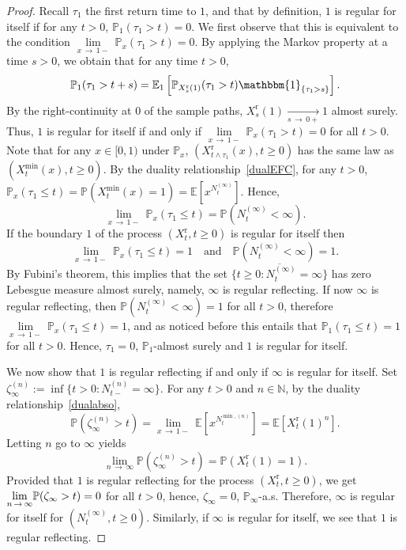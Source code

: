 \documentclass[10pt]{amsart}
\theoremstyle{definition}\newtheorem{defi}[theo]{Definition}\newtheorem{rema}[theo]{Remark}\newtheorem{exam}[theo]{Example}\newtheorem{exem}[theo]{Example}\newtheorem{nota}[theo]{Notation}
\newcommand{\rmr}{\mathrm{r}}
\newcommand{\bbmun}{\mathbbm{1}}
\newcommand{\bbN}{\mathbb{N}}
\newcommand{\bbE}{\mathbb{E}}
\newcommand{\bbP}{\mathbb{P}}
\begin{document}
\begin{proof}
Recall $\tau_1$ the first return time to $1$, and that by definition, $1$ is regular for itself if for any $t>0$, $\bbP_1(\tau_1>t)=0$. We first observe that this is equivalent to the condition $\underset{x\,\rightarrow\,1-}{\lim}\ \bbP_x(\tau_1>t)=0$. By applying the Markov property at a time $s>0$, we obtain that for any time $t>0$,
\[
\bbP_1 (\tau_1>t+s)=\bbE_1\left[\bbP_{X^{\rmr}_s(1)}(\tau_1>t)\bbmun_{\left\{\tau_1>s\right\}}\right].
\]
By the right-continuity at $0$ of the sample paths, $X^{\rmr}_s(1)\underset{s\,\rightarrow\,0+}{\longrightarrow} 1$ almost surely. Thus, $1$ is regular for itself if and only if $\underset{x\,\rightarrow\,1-}{\lim}\ \bbP_x(\tau_1>t)=0$ for all $t>0$. Note that for any $x\in [0,1)$ under $\bbP_x$,
$(X^{\rmr}_{t\wedge \tau_1}(x),t\geq 0)$ has the same law as $(X_t^{\min}(x),t\geq 0)$. By the duality relationship~\eqref{dualEFC}, for any $t>0$, $\bbP_x(\tau_1\leq t)=\bbP(X_t^{\min}(x)=1)=\bbE[x^{N_t^{(\infty)}}].$ Hence, 
\[
\underset{x\,\rightarrow\,1-}{\lim} \ \bbP_x(\tau_1\leq t)=\bbP\left(N_t^{(\infty)}<\infty\right).
\]
If the boundary $1$ of the process $(X_t^{\rmr},t\geq 0)$ is regular for itself then 
\[
\underset{x\,\rightarrow\,1-}{\lim}\ \bbP_x(\tau_1\leq t)=1\quad\text{and}\quad\bbP\left(N_t^{(\infty)}<\infty\right)=1.
\]
By Fubini's theorem, this implies that the set $\overline{\{t\geq 0: N^{(\infty)}_t=\infty\}}$ has zero Lebesgue measure almost surely, namely, $\infty$ is regular reflecting. If now $\infty$ is regular reflecting, then $\bbP(N_t^{(\infty)}<\infty)=1$ for all $t>0$, therefore $\underset{x\,\rightarrow\,1-}{\lim}\ \bbP_x(\tau_1\leq t)=1$, and as noticed before this entails that $\bbP_1(\tau_1\leq t)=1$ for all $t>0$. Hence, $\tau_1=0$, $\bbP_1$-almost surely and $1$ is regular for itself.

We now show that $1$ is regular reflecting if and only if $\infty$ is regular for itself. Set $\zeta_\infty^{(n)}:=\inf\{t>0: N_{t-}^{(n)}=\infty\}$. For any $t>0$ and $n\in \bbN$, by the duality relationship~\eqref{dualabso}, 
\[
\bbP\left(\zeta_\infty^{(n)}>t\right)=\underset{x\,\rightarrow \,1-}{\lim}\ \bbE\left[x^{N_t^{\min,(n)}}\right]=\bbE\left[X_t^{\rmr}(1)^n\right].
\]
Letting $n$ go to $\infty$ yields
\[
\underset{n\,\rightarrow\,\infty}{\lim} \bbP(\zeta_\infty^{(n)}>t)=\bbP(X_t^{\rmr}(1)=1).
\]
Provided that $1$ is regular reflecting for the process $(X_t^{\rmr},t\geq 0)$, we get $\underset{n\,\rightarrow\,\infty}{\lim} \bbP(\zeta_\infty\linebreak > t)=0$ for all $t>0$, hence, $\zeta_\infty=0$, $\bbP_{\infty}$-a.s. Therefore, $\infty$ is regular for itself for $(N_t^{(\infty)},t\geq 0)$. Similarly, if $\infty$ is regular for itself, we see that $1$ is regular reflecting.
\end{proof}
\end{document}
